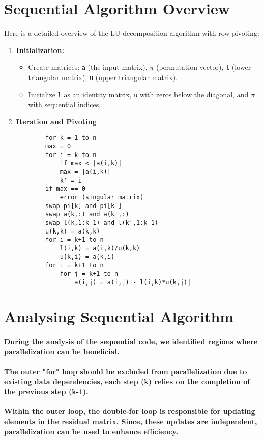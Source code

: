 \documentclass[12pt]{article}
\begin{document}
\section{Sequential Algorithm Overview}
Here is a detailed overview of the LU decomposition algorithm with row pivoting:
\begin{enumerate}
    \item \textbf{Initialization:}
    \begin{itemize}
        \item Create matrices: \verb|a| (the input matrix), \textbf{$\pi$} (permutation vector), \verb|l| (lower triangular matrix), \verb|u| (upper triangular matrix).
        \item Initialize \verb|l| as an identity matrix, \verb|u| with zeros below the diagonal, and \textbf{$\pi$} with sequential indices.
    \end{itemize}
    \item \textbf{Iteration and Pivoting}
    \begin{verbatim}
        for k = 1 to n
        max = 0
        for i = k to n
            if max < |a(i,k)|
            max = |a(i,k)|
            k' = i
        if max == 0
            error (singular matrix)
        swap pi[k] and pi[k']
        swap a(k,:) and a(k',:)
        swap l(k,1:k-1) and l(k',1:k-1)
        u(k,k) = a(k,k)
        for i = k+1 to n
            l(i,k) = a(i,k)/u(k,k)
            u(k,i) = a(k,i)
        for i = k+1 to n
            for j = k+1 to n
                a(i,j) = a(i,j) - l(i,k)*u(k,j)|
    \end{verbatim}
\end{enumerate}

\section{Analysing Sequential Algorithm}
\paragraph{During the analysis of the sequential code, we identified regions where parallelization can be beneficial.}
\paragraph{The outer "for" loop should be excluded from parallelization due to existing data dependencies, each step (k) relies on the completion of the previous step (k-1).}
\paragraph{Within the outer loop, the double-for loop is responsible for updating elements in the residual matrix. Since, these updates are independent, parallelization can be used to enhance efficiency.}
\end{document}
